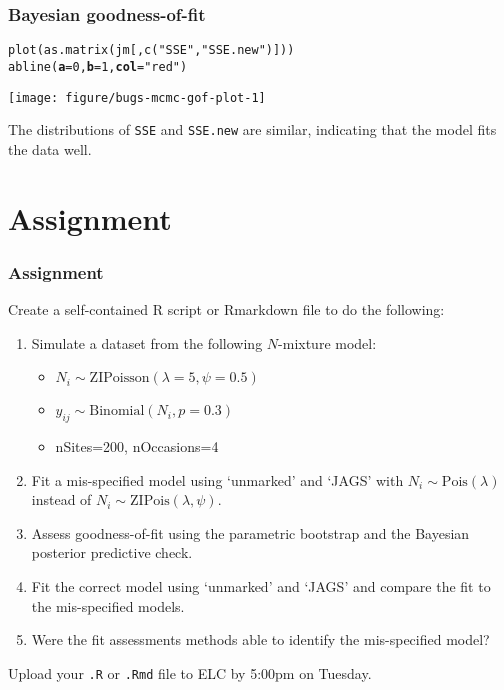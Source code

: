 \documentclass[color=usenames,dvipsnames]{beamer}\usepackage[]{graphicx}\usepackage[]{xcolor}
\makeatletter
\newcommand{\hlnum}[1]{\textcolor[rgb]{0.69,0.494,0}{#1}}%
\newcommand{\hlsng}[1]{\textcolor[rgb]{0.749,0.012,0.012}{#1}}%
\newcommand{\hldef}[1]{\textcolor[rgb]{0,0,0}{#1}}%
\newcommand{\hlkwc}[1]{\textcolor[rgb]{0,0,0}{\textbf{#1}}}%
\newcommand{\hlkwd}[1]{\textcolor[rgb]{0.004,0.004,0.506}{#1}}%
\newenvironment{kframe}{%
 \def\at@end@of@kframe{}%
 \ifinner\ifhmode%
  \def\at@end@of@kframe{\end{minipage}}%
  \begin{minipage}{\columnwidth}%
 \fi\fi%
 \def\FrameCommand##1{\hskip\@totalleftmargin \hskip-\fboxsep
 \colorbox{shadecolor}{##1}\hskip-\fboxsep
     \hskip-\linewidth \hskip-\@totalleftmargin \hskip\columnwidth}%
 \MakeFramed {\advance\hsize-\width
   \@totalleftmargin\z@ \linewidth\hsize
   \@setminipage}}%
 {\par\unskip\endMakeFramed%
 \at@end@of@kframe}
\newenvironment{knitrout}{}{} %
\newcommand{\inr}[1]{\colorbox{inlinecolor}{\texttt{#1}}}
\makeatother
\begin{document}
\begin{frame}[fragile]
  \frametitle{Bayesian goodness-of-fit}
\begin{knitrout}\footnotesize
{}\color{fgcolor}\begin{kframe}
\begin{alltt}
\hlkwd{plot}\hldef{(}\hlkwd{as.matrix}\hldef{(jm[,}\hlkwd{c}\hldef{(}\hlsng{"SSE"}\hldef{,} \hlsng{"SSE.new"}\hldef{)]))}
\hlkwd{abline}\hldef{(}\hlkwc{a}\hldef{=}\hlnum{0}\hldef{,} \hlkwc{b}\hldef{=}\hlnum{1}\hldef{,} \hlkwc{col}\hldef{=}\hlsng{"red"}\hldef{)}
\end{alltt}
\end{kframe}

{\centering \texttt{[image: figure/bugs-mcmc-gof-plot-1]} 

}


\end{knitrout}
  \vfill
  \small
  The distributions of {\tt SSE} and {\tt SSE.new} are similar,
  indicating that the model fits the data well.
\end{frame}






\section{Assignment}




\begin{frame}[fragile]
  \frametitle{Assignment}
  \footnotesize
  Create a self-contained R script or Rmarkdown file
  to do the following:
  \vfill
  \begin{enumerate}
    \footnotesize
    \item Simulate a dataset from the following $N$-mixture model:
      \begin{itemize}
        \footnotesize
        \item $N_i \sim \mathrm{ZIPoisson}(\lambda=5, \psi=0.5)$
        \item $y_{ij} \sim \mathrm{Binomial}(N_i, p=0.3)$
        \item nSites=200, nOccasions=4
      \end{itemize}
    \item Fit a \alert{mis-specified model} using `unmarked' and `JAGS' with
      $N_i \sim \mathrm{Pois}(\lambda)$ instead of
      $N_i \sim \mathrm{ZIPois}(\lambda, \psi)$.
    \item Assess goodness-of-fit using the parametric bootstrap and
      the Bayesian posterior predictive check.
    \item Fit the \alert{correct model} using `unmarked' and `JAGS'
      and compare the fit to the mis-specified models.
    \item Were the fit assessments methods able to identify the
      mis-specified model?
  \end{enumerate}
  \vfill
  Upload your {\tt .R} or {\tt .Rmd} file to ELC by 5:00pm on Tuesday. 
\end{frame}
\end{document}
